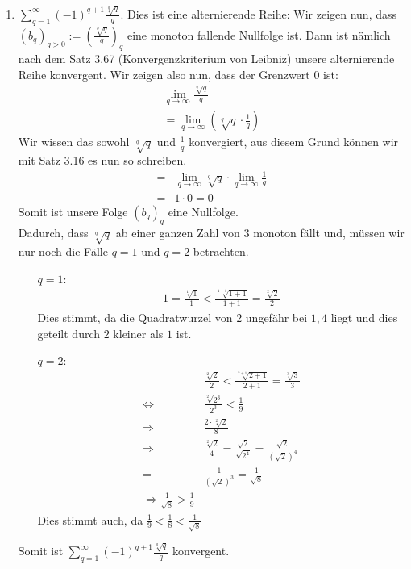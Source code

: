 \begin{lsg}
\begin{enumerate}[label=$\mathrm{(\roman*)}$, ref=$\mathrm{\roman*}$]
\item $\sum^{\infty}_{q=1}(-1)^{q+1}\frac{\sqrt[q]{q}}{q}$. Dies ist eine alternierende Reihe: Wir zeigen nun, dass $(b_q)_{q > 0}:=\left(\frac{\sqrt[q]{q}}{q}\right)_q$ eine monoton fallende Nullfolge ist. Dann ist nämlich nach dem Satz 3.67 (Konvergenzkriterium von Leibniz) unsere alternierende Reihe konvergent. Wir zeigen also nun, dass der Grenzwert $0$ ist:
\begin{align*}
\lim_{q \to \infty}\frac{\sqrt[q]{q}}{q} \\
= \lim_{q \to \infty}\left(\sqrt[q]{q}\cdot \frac{1}{q}\right)
\end{align*}
Wir wissen das sowohl $\sqrt[q]{q}$ und $\frac{1}{q}$ konvergiert, aus diesem Grund können wir mit Satz 3.16 es nun so schreiben.
\begin{align*}
= &\lim_{q \to \infty}\sqrt[q]{q}\cdot \lim_{q \to \infty}\frac{1}{q} \\
= &1 \cdot 0 = 0
\end{align*}
Somit ist unsere Folge $(b_q)_q$ eine Nullfolge. \\
Dadurch, dass $\sqrt[q]{q}$ ab einer ganzen Zahl von $3$ monoton fällt und, müssen wir nur noch die Fälle $q=1$ und $q=2$ betrachten.
\begin{itemize}
\item[$q=1$:]\begin{align*}
1 = \frac{\sqrt[1]{1}}{1} < \frac{\sqrt[1+1]{1+1}}{1+1} = \frac{\sqrt[2]{2}}{2}
\end{align*}
Dies stimmt, da die Quadratwurzel von 2 ungefähr bei $1,4$ liegt und dies geteilt durch $2$ kleiner als $1$ ist.
\item[$q=2$:]\begin{align*}
&\frac{\sqrt[2]{2}}{2} < \frac{\sqrt[2+1]{2+1}}{2+1} = \frac{\sqrt[3]{3}}{3} \\
\Leftrightarrow &\frac{\sqrt[2]{2^3}}{2^3} < \frac{1}{9} \\
\Rightarrow &\frac{2 \cdot \sqrt[2]{2}}{8} \\
\Rightarrow &\frac{\sqrt[2]{2}}{4} = \frac{\sqrt{2}}{\sqrt{2^4}} = \frac{\sqrt{2}}{(\sqrt{2})^4} \\
= &\frac{1}{(\sqrt{2})^3} = \frac{1}{\sqrt{8}} \\
\Rightarrow \frac{1}{\sqrt{8}} > \frac{1}{9}
\end{align*}
Dies stimmt auch, da $\frac{1}{9} < \frac{1}{8} < \frac{1}{\sqrt{8}}$
\end{itemize}
Somit ist $\sum^{\infty}_{q=1}(-1)^{q+1}\frac{\sqrt[q]{q}}{q}$ konvergent.


\end{enumerate}
\end{lsg}
